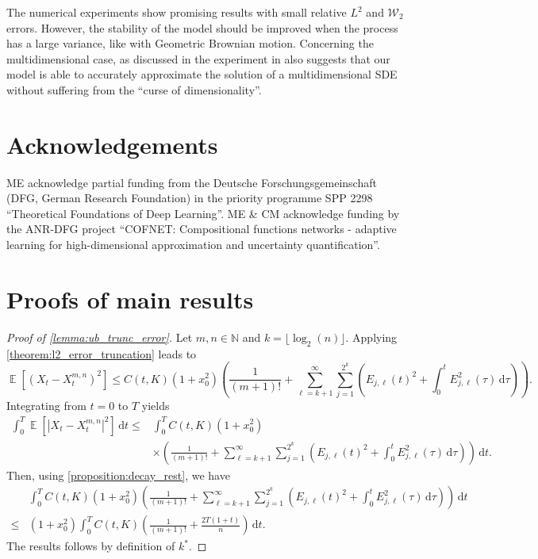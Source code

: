 \documentclass[12pt]{article}
\theoremstyle{remark}
\theoremstyle{plain}
\numberwithin{equation}{section}
\newcommand{\dd}{\ensuremath{\,\mathrm d}}
\DeclareMathOperator{\E}{\mathbb E}
\newcommand{\N}{\mathbb{N}}
\begin{document}
The numerical experiments show promising results with small relative $L^2$ and $\mathcal W_2$ errors. However, the stability of the model should be improved when the process has a large variance, like with Geometric Brownian motion. Concerning the multidimensional case, as discussed in  the experiment in  also suggests that our model is able to accurately approximate the solution of a multidimensional SDE without suffering from the ``curse of dimensionality''.

\section*{Acknowledgements}
ME acknowledge partial funding from the Deutsche Forschungsgemeinschaft (DFG, German Research Foundation) in the priority programme SPP 2298 ``Theoretical Foundations of Deep Learning''. ME \& CM acknowledge funding by the ANR-DFG project ``COFNET: Compositional functions networks - adaptive learning for high-dimensional approximation and uncertainty quantification''.

    
    

    \appendix
\section{Proofs of main results}

\setcounter{subsection}{1}

\begin{proof}[Proof of \cref{lemma:ub_trunc_error}]
    Let $m,n \in \N$ and $k = \lfloor \log_2(n) \rfloor$.
    Applying \cref{theorem:l2_error_truncation} leads to
    \begin{equation*}
        \E[(X_t - X_t^{m,n})^2] \leq C(t,K)(1+x_0^2)\left(\frac{1}{(m+1)!} + \sum_{\ell=k+1}^\infty \sum_{j=1}^{2^k} \left(E_{j,\ell}(t)^2 + \int_0^t E_{j,\ell}^2(\tau)\dd\tau\right) \right).
    \end{equation*}
    Integrating from $t=0$ to $T$ yields
    \begin{align*}
        \int_0^T \E[|X_t - X_t^{m,n}|^2]\dd t 
        \leq &\int_0^T C(t,K)(1+x_0^2)\\
        &\times \left(\frac{1}{(m+1)!} + \sum_{\ell=k+1}^\infty\sum_{j=1}^{2^k} \left(E_{j,\ell}(t)^2 + \int_0^t E_{j,\ell}^2(\tau)\dd\tau\right)\right)\dd t.
    \end{align*}
    Then, using \cref{proposition:decay_rest}, we have
    \begin{align*}
        &\int_0^T C(t,K)(1+x_0^2) \left(\frac{1}{(m+1)!} + \sum_{\ell=k+1}^\infty\sum_{j=1}^{2^k} \left(E_{j,\ell}(t)^2 + \int_0^t E_{j,\ell}^2(\tau)\dd\tau\right)\right)\dd t \\
        \leq& (1+x_0^2)\int_0^T C(t, K)\left(\frac{1}{(m+1)!} + \frac{2T(1+t)}{n}\right) \dd t.
    \end{align*}
    The results follows by definition of $k^*$.
\end{proof}
\end{document}
